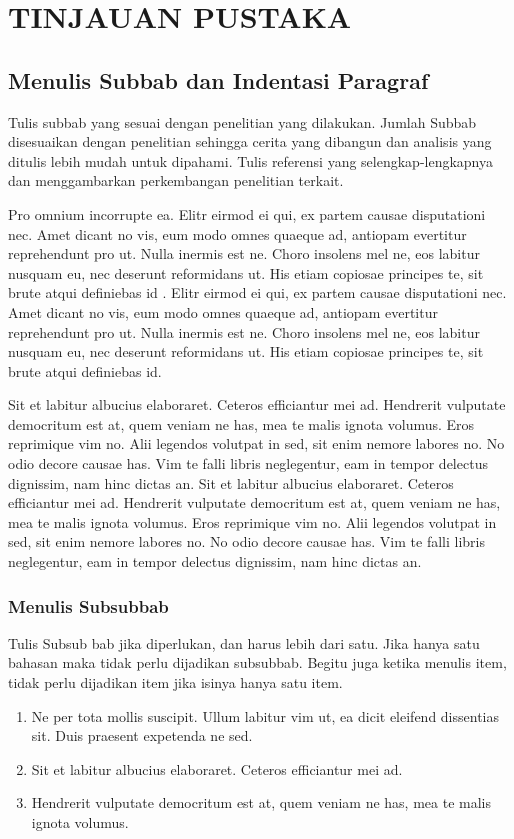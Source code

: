 \chapter{TINJAUAN PUSTAKA}


\section{Menulis Subbab dan Indentasi Paragraf}
Tulis subbab yang sesuai dengan penelitian yang dilakukan. Jumlah Subbab disesuaikan dengan penelitian sehingga cerita yang dibangun dan analisis yang ditulis lebih mudah untuk dipahami. Tulis referensi yang selengkap-lengkapnya dan menggambarkan perkembangan penelitian terkait.

Pro omnium incorrupte ea. Elitr eirmod ei qui, ex partem causae disputationi nec. Amet dicant no vis, eum modo omnes quaeque ad, antiopam evertitur reprehendunt pro ut. Nulla inermis est ne. Choro insolens mel ne, eos labitur nusquam eu, nec deserunt reformidans ut. His etiam copiosae principes te, sit brute atqui definiebas id \cite{mumpuni_future_2018}. Elitr eirmod ei qui, ex partem causae disputationi nec. Amet dicant no vis, eum modo omnes quaeque ad, antiopam evertitur reprehendunt pro ut. Nulla inermis est ne. Choro insolens mel ne, eos labitur nusquam eu, nec deserunt reformidans ut. His etiam copiosae principes te, sit brute atqui definiebas id.

Sit et labitur albucius elaboraret. Ceteros efficiantur mei ad. Hendrerit vulputate democritum est at, quem veniam ne has, mea te malis ignota volumus. Eros reprimique vim no. Alii legendos volutpat in sed, sit enim nemore labores no. No odio decore causae has. Vim te falli libris neglegentur, eam in tempor delectus dignissim, nam hinc dictas an. Sit et labitur albucius elaboraret. Ceteros efficiantur mei ad. Hendrerit vulputate democritum est at, quem veniam ne has, mea te malis ignota volumus. Eros reprimique vim no. Alii legendos volutpat in sed, sit enim nemore labores no. No odio decore causae has. Vim te falli libris neglegentur, eam in tempor delectus dignissim, nam hinc dictas an.

\subsection{Menulis Subsubbab}
Tulis Subsub bab jika diperlukan, dan harus lebih dari satu. Jika hanya satu bahasan maka tidak perlu dijadikan subsubbab. Begitu juga ketika menulis item, tidak perlu dijadikan item jika isinya hanya satu item.
\begin{enumerate}
    \item Ne per tota mollis suscipit. Ullum labitur vim ut, ea dicit eleifend dissentias sit. Duis praesent expetenda ne sed.
    \item Sit et labitur albucius elaboraret. Ceteros efficiantur mei ad.
    \item Hendrerit vulputate democritum est at, quem veniam ne has, mea te malis ignota volumus.
\end{enumerate}

